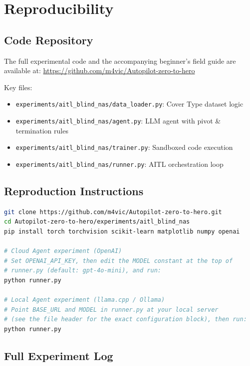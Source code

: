 \documentclass[11pt]{article}
\begin{document}
\section{Reproducibility}
\label{sec:appendix}

\subsection{Code Repository}

The full experimental code and the accompanying beginner's field guide are available at: \url{https://github.com/m4vic/Autopilot-zero-to-hero}

Key files:
\begin{itemize}[nosep]
  \item \texttt{experiments/aitl\_blind\_nas/data\_loader.py}: Cover Type dataset logic
  \item \texttt{experiments/aitl\_blind\_nas/agent.py}: LLM agent with pivot \& termination rules
  \item \texttt{experiments/aitl\_blind\_nas/trainer.py}: Sandboxed code execution
  \item \texttt{experiments/aitl\_blind\_nas/runner.py}: AITL orchestration loop
\end{itemize}

\subsection{Reproduction Instructions}

\begin{lstlisting}[language=bash]
git clone https://github.com/m4vic/Autopilot-zero-to-hero.git
cd Autopilot-zero-to-hero/experiments/aitl_blind_nas
pip install torch torchvision scikit-learn matplotlib numpy openai

# Cloud Agent experiment (OpenAI)
# Set OPENAI_API_KEY, then edit the MODEL constant at the top of
# runner.py (default: gpt-4o-mini), and run:
python runner.py

# Local Agent experiment (llama.cpp / Ollama)
# Point BASE_URL and MODEL in runner.py at your local server
# (see the file header for the exact configuration block), then run:
python runner.py
\end{lstlisting}

\subsection{Full Experiment Log}
\end{document}
